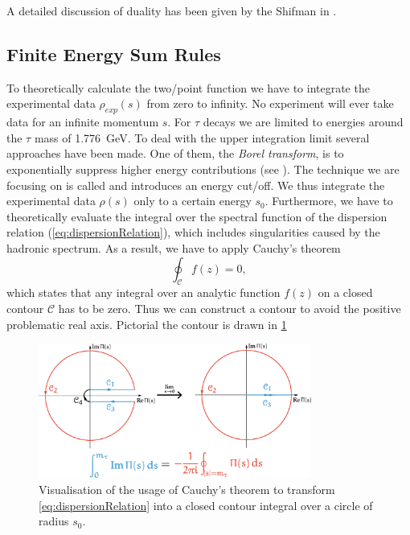 \documentclass[../../index.tex]{subfiles}
\begin{document}
A detailed discussion of duality has been given by the Shifman in
\cite{Shifman2000}.


\subsection{Finite Energy Sum Rules}
To theoretically calculate the two\-/point function we have to integrate the
experimental data \(\rho_{exp}(s)\) from zero to infinity. No experiment will
ever take data for an infinite momentum \(s\). For \(\tau\) decays we are
limited to energies around the \(\tau\) mass of \SI{1.776}{\giga\eV}. To deal
with the upper integration limit several approaches have been made. One of them,
the \textit{Borel transform}, is to exponentially suppress higher energy
contributions (see \cite{Weinberg1996,Rafael1997}). The technique we are
focusing on is called  and introduces an
energy cut\-/off. We thus integrate the experimental data \(\rho(s)\) only to a
certain energy \(s_0\). Furthermore, we have to theoretically evaluate the
integral over the spectral function of the dispersion relation
(\cref{eq:dispersionRelation}), which includes singularities caused by the
hadronic spectrum. As a result, we have to apply Cauchy's theorem
\begin{equation}
  \oint_{\mathcal{C}} f(z) = 0,
\end{equation}
which states that any integral over an analytic function \(f(z)\) on a closed
contour \(\mathcal{C}\) has to be zero. Thus we can construct a contour to avoid
the positive problematic real axis. Pictorial the contour is drawn in
\cref{fig:theoreticalTwoPointFunction}
\begin{figure}
  \centering
  \includegraphics[width=0.8\textwidth]{./images/rTauCauchysTheorem.eps}
  \caption{Visualisation of the usage of Cauchy's theorem to transform
    \cref{eq:dispersionRelation} into a closed contour integral over a circle of
    radius \(s_0\).}
  \label{fig:theoreticalTwoPointFunction}
\end{figure}
\end{document}
